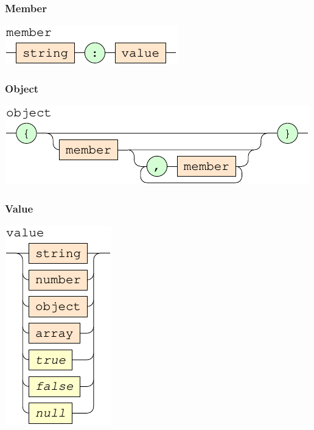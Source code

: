 \documentclass[a4paper]{article}
\begin{document}
\subsubsection{Member}


{\centering

   \includegraphics[scale=0.9]{syntax/ContextFree/member}

}

\subsubsection{Object}


{\centering

   \includegraphics[scale=0.9]{syntax/ContextFree/object}

}

\subsubsection{Value}


{\centering

   \includegraphics[scale=0.9]{syntax/ContextFree/value}

}
\end{document}
